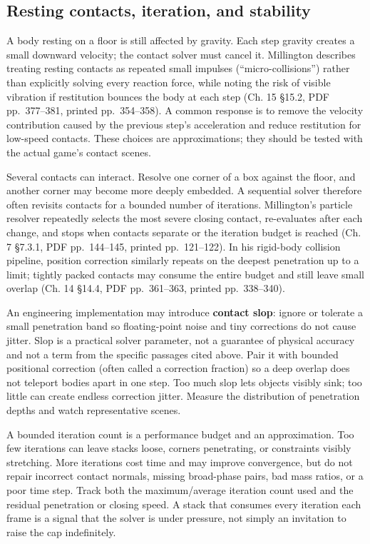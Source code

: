 \subsection{Resting contacts, iteration, and stability}\label{06-engine-ii-ch033-resting-contacts-iteration-and-stability}

A body resting on a floor is still affected by gravity. Each step gravity creates a small downward velocity; the contact solver must cancel it. Millington describes treating resting contacts as repeated small impulses (``micro-collisions'') rather than explicitly solving every reaction force, while noting the risk of visible vibration if restitution bounces the body at each step (Ch. 15 §15.2, PDF pp.~377--381, printed pp.~354--358). A common response is to remove the velocity contribution caused by the previous step's acceleration and reduce restitution for low-speed contacts. These choices are approximations; they should be tested with the actual game's contact scenes.

Several contacts can interact. Resolve one corner of a box against the floor, and another corner may become more deeply embedded. A sequential solver therefore often revisits contacts for a bounded number of iterations. Millington's particle resolver repeatedly selects the most severe closing contact, re-evaluates after each change, and stops when contacts separate or the iteration budget is reached (Ch. 7 §7.3.1, PDF pp.~144--145, printed pp.~121--122). In his rigid-body collision pipeline, position correction similarly repeats on the deepest penetration up to a limit; tightly packed contacts may consume the entire budget and still leave small overlap (Ch. 14 §14.4, PDF pp.~361--363, printed pp.~338--340).

An engineering implementation may introduce \textbf{contact slop}: ignore or tolerate a small penetration band so floating-point noise and tiny corrections do not cause jitter. Slop is a practical solver parameter, not a guarantee of physical accuracy and not a term from the specific passages cited above. Pair it with bounded positional correction (often called a correction fraction) so a deep overlap does not teleport bodies apart in one step. Too much slop lets objects visibly sink; too little can create endless correction jitter. Measure the distribution of penetration depths and watch representative scenes.

A bounded iteration count is a performance budget and an approximation. Too few iterations can leave stacks loose, corners penetrating, or constraints visibly stretching. More iterations cost time and may improve convergence, but do not repair incorrect contact normals, missing broad-phase pairs, bad mass ratios, or a poor time step. Track both the maximum/average iteration count used and the residual penetration or closing speed. A stack that consumes every iteration each frame is a signal that the solver is under pressure, not simply an invitation to raise the cap indefinitely.

